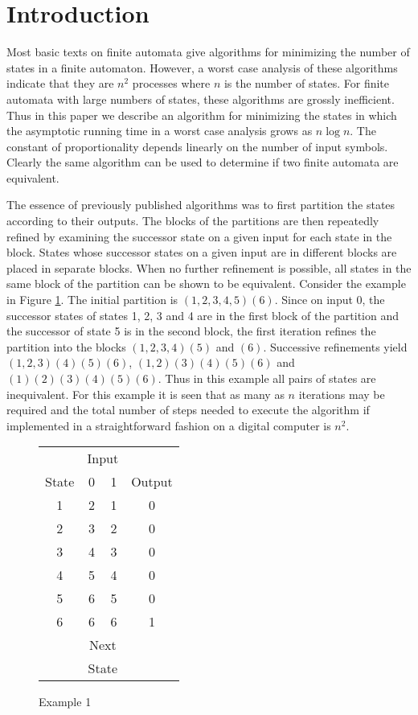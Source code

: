 \section{Introduction}

Most basic texts on finite automata give algorithms for minimizing the number of states in a finite
automaton. However, a worst case analysis of these algorithms indicate that they are $n^2$ processes
where $n$ is the number of states. For finite automata with large numbers of states, these algorithms
are grossly inefficient. Thus in this paper we describe an algorithm for minimizing the states in
which the asymptotic running time in a worst case analysis grows as $n \log n$. The constant of
proportionality depends linearly on the number of input symbols. Clearly the same algorithm can be
used to determine if two finite automata are equivalent.

The essence of previously published algorithms was to first partition the states according to their
outputs. The blocks of the partitions are then repeatedly refined by examining the successor state on a
given input for each state in the block. States whose successor states on a given input are in different
blocks are placed in separate blocks. When no further refinement is possible, all states in the same block of
the partition can be shown to be equivalent. Consider the example in Figure \ref{example01}.
The initial partition is
$(1,2,3,4,5)(6)$. Since on input $0$, the successor states of states 1, 2, 3 and 4 are in the first
block of the partition and the successor of state 5 is in the second block, the first iteration
refines the partition into the blocks $(1,2,3,4)(5)$ and $(6)$. Successive refinements yield
$(1,2,3)(4)(5)(6)$, $(1,2)(3)(4)(5)(6)$ and $(1)(2)(3)(4)(5)(6)$. Thus in this example all pairs
of states are inequivalent. For this example it is seen that as many as $n$ iterations may be required
and the total number of steps needed to execute the algorithm if implemented in a straightforward
fashion on a digital computer is $n^2$.

\begin{figure}[ht]
\caption{Example 1}
\label{example01}
\begin{center}
\begin{tabular}{c|cc|c}
      & \multicolumn{2}{|c|}{Input} &  \\
State & 0 & 1 & Output \\
\hline
1     & 2 & 1 & 0      \\
2     & 3 & 2 & 0      \\
3     & 4 & 3 & 0      \\
4     & 5 & 4 & 0      \\
5     & 6 & 5 & 0      \\
6     & 6 & 6 & 1      \\
\multicolumn{1}{c}{}  & \multicolumn{2}{c}{Next}  & \multicolumn{1}{c}{} \\
\multicolumn{1}{c}{}  & \multicolumn{2}{c}{State} & \multicolumn{1}{c}{} \\
\end{tabular}
\end{center}
\end{figure}


